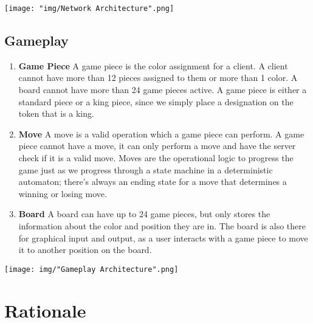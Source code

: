 \documentclass{scrreprt}
\begin{document}
			 \texttt{[image: "img/Network Architecture".png]}

		\subsection {Gameplay}
			\begin{enumerate} [label*=\arabic*.]
			\item \textbf{Game Piece}
				A game piece is the color assignment for a client. A client cannot have more than 12 pieces assigned to them or more than 1 color. A board cannot have more than 24 game pieces active. A game piece is either a standard piece or a king piece, since we simply place a designation on the token that is a king.
	
			\item \textbf{Move}
				A move is a valid operation which a game piece can perform. A game piece cannot have a move, it can only perform a move and have the server check if it is a valid move. Moves are the operational logic to progress the game just as we progress through a state machine in a deterministic automaton; there's always an ending state for a move that determines a winning or losing move.

			\item \textbf{Board}
				A board can have up to 24 game pieces, but only stores the information about the color and position they are in. The board is also there for graphical input and output, as a user interacts with a game piece to move it to another position on the board. 

			\end{enumerate}

		 \texttt{[image: img/"Gameplay Architecture".png]}
		

	\section{Rationale}
\end{document}

